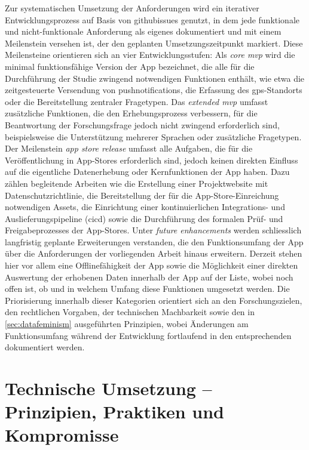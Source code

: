 Zur systematischen Umsetzung der Anforderungen wird ein iterativer Entwicklungsprozess auf Basis von \glspl{githubissue} genutzt, in dem jede funktionale und nicht-funktionale Anforderung als eigenes  dokumentiert und mit einem Meilenstein versehen ist, der den geplanten Umsetzungszeitpunkt markiert. Diese Meilensteine orientieren sich an vier Entwicklungsstufen: Als \textit{core \acrfull{mvp}} wird die minimal funktionsfähige Version der App bezeichnet, die alle für die Durchführung der Studie zwingend notwendigen Funktionen enthält, wie etwa die zeitgesteuerte Versendung von \glspl{pushnotification}, die Erfassung des \gls{gps}-Standorts oder die Bereitstellung zentraler Fragetypen. Das \textit{extended \gls{mvp}} umfasst zusätzliche Funktionen, die den Erhebungsprozess verbessern, für die Beantwortung der Forschungsfrage jedoch nicht zwingend erforderlich sind, beispielsweise die Unterstützung mehrerer Sprachen oder zusätzliche Fragetypen. Der Meilenstein \textit{app store release} umfasst alle Aufgaben, die für die Veröffentlichung in App-Stores erforderlich sind, jedoch keinen direkten Einfluss auf die eigentliche Datenerhebung oder Kernfunktionen der App haben. Dazu zählen begleitende Arbeiten wie die Erstellung einer Projektwebsite mit Datenschutzrichtlinie, die Bereitstellung der für die App-Store-Einreichung notwendigen Assets, die Einrichtung einer kontinuierlichen Integrations- und Auslieferungspipeline (\gls{cicd}) sowie die Durchführung des formalen Prüf- und Freigabeprozesses der App-Stores. Unter \textit{future enhancements} werden schliesslich langfristig geplante Erweiterungen verstanden, die den Funktionsumfang der App über die Anforderungen der vorliegenden Arbeit hinaus erweitern. Derzeit stehen hier vor allem eine Offlinefähigkeit der App sowie die Möglichkeit einer direkten Auswertung der erhobenen Daten innerhalb der App auf der Liste, wobei noch offen ist, ob und in welchem Umfang diese Funktionen umgesetzt werden. Die Priorisierung innerhalb dieser Kategorien orientiert sich an den Forschungszielen, den rechtlichen Vorgaben, der technischen Machbarkeit sowie den in \cref{sec:datafeminism} ausgeführten Prinzipien, wobei Änderungen am Funktionsumfang während der Entwicklung fortlaufend in den entsprechenden  dokumentiert werden.


\section{Technische Umsetzung -- Prinzipien, Praktiken und Kompromisse}
\label{sec:app_entwicklung_technische_umsetzung}


